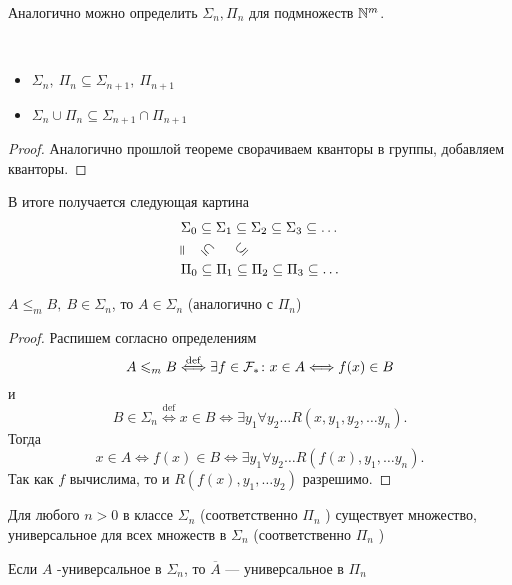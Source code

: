 \begin{note}
    Аналогично можно определить $ \Sigma _n, \Pi_n$ для подмножеств $ \mathbb{N}^{m}$.
\end{note}
\begin{prop}
	~\begin{itemize}
		\item $ \Sigma _n, ~ \Pi _n \subseteq \Sigma _{n+1}, ~\Pi_{n+1}$
	\item $ \Sigma _n \cup \Pi _n \subseteq \Sigma _{n+1} \cap \Pi _{n+1}$
	\end{itemize}
\end{prop}
\begin{proof}
    Аналогично прошлой теореме сворачиваем кванторы в группы, добавляем кванторы.
\end{proof}

В итоге получается следующая картина
\begin{align*}
	& \Sigma_0 \subseteq \Sigma _1 \subseteq  \Sigma _2 \subseteq \Sigma _3 \subseteq \ldots \\
	&\rotatebox[origin=c]{90}{=} \quad \rotatebox[origin=c]{-45}{$\subseteq$} \quad~  \rotatebox[origin=c]{45}{$\subseteq$}\\
	& \Pi_0 \subseteq \Pi _1 \subseteq  \Pi _2 \subseteq \Pi _3 \subseteq \ldots
\end{align*}

\begin{thm}
    $ A \le _m B ,  ~ B \in \Sigma _n$, то $ A \in \Sigma _{n}$ (аналогично с $ \Pi_n$)   
\end{thm}
\begin{proof}
	Распишем согласно определениям
	\[
		A \leqslant _m B \stackrel{\operatorname{def}}{\Longleftrightarrow }  \exists f \in \mathcal{F}_{*}\colon x \in A \Longleftrightarrow f(x) \in  B
	\] 
	и
	\[
		B \in \Sigma _n \stackrel{\operatorname{def}}{\Longleftrightarrow } x \in B \Longleftrightarrow \exists y_1 \forall y_2 \ldots R(x, y_1, y_2, \ldots y_n)
	.\] 
	Тогда 
	\[
		x \in A \Longleftrightarrow f(x) \in B \Longleftrightarrow \exists y_1 \forall y_2 \ldots R(f(x), y_1, \ldots y_{n})
	.\] 
	Так как $ f$ вычислима, то и $ R(f(x), y_1, \ldots y_2)$ разрешимо.
\end{proof}

\begin{thm}
    Для любого $ n>0$ в классе $ \Sigma_n $ (соответственно $ \Pi_n$ ) существует множество, универсальное для всех множеств в $ \Sigma _n$ (соответственно $ \Pi_n $ ) 
\end{thm}
\begin{note}
    Если $ A$ -универсальное в $ \Sigma _n$, то $ \overline{A}$ --- универсальное в $ \Pi_n$
\end{note}

